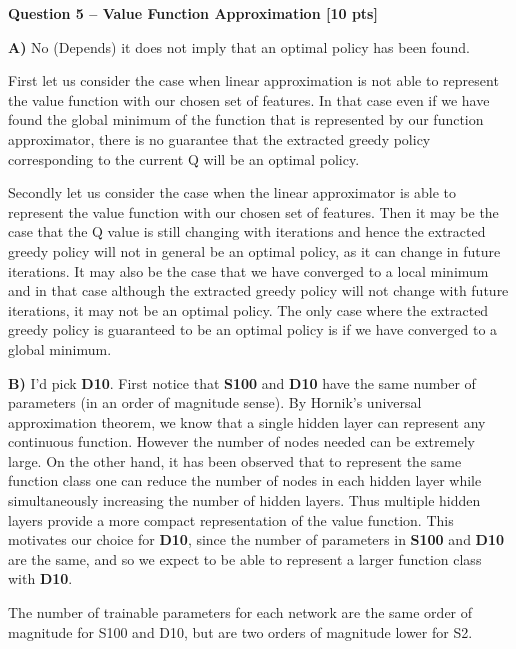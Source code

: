\newpage
\textbf{\Large Question 5 -- Value Function Approximation \hfill [10 pts]}
\vspace{0.5cm}

\textbf{A)} No (Depends) it does not imply that an optimal policy has been found. 

First let us consider the case when linear approximation is not able to represent the value function with our chosen set of features. In that case even if we have found the global minimum of the function that is represented by our function approximator, there is no guarantee that the extracted greedy policy corresponding to the current Q will be an optimal policy. 

Secondly let us consider the case when the linear approximator is able to represent the value function with our chosen set of features. Then it may be the case that the Q value is still changing with iterations and hence the extracted greedy policy will not in general be an optimal policy, as it can change in future iterations. It may also be the case that we have converged to a local minimum and in that case although the extracted greedy policy will not change with future iterations, it may not be an optimal policy. The only case where the extracted greedy policy is guaranteed to be an optimal policy is if we have converged to a global minimum.

\textbf{B)} I'd pick \textbf{D10}. First notice that \textbf{S100} and \textbf{D10} have the same number of parameters (in an order of magnitude sense). By Hornik's universal approximation theorem, we know that a single hidden layer can represent any continuous function. However the number of nodes needed can be extremely large. On the other hand, it has been observed that to represent the same function class one can reduce the number of nodes in each hidden layer while simultaneously increasing the number of hidden layers. Thus multiple hidden layers provide a more compact representation of the value function. This motivates our choice for \textbf{D10}, since the number of parameters in \textbf{S100} and \textbf{D10} are the same, and so we expect to be able to represent a larger function class with \textbf{D10}.

The number of trainable parameters for each network are the same order of magnitude for S100 and D10, but are two orders of magnitude lower for S2.